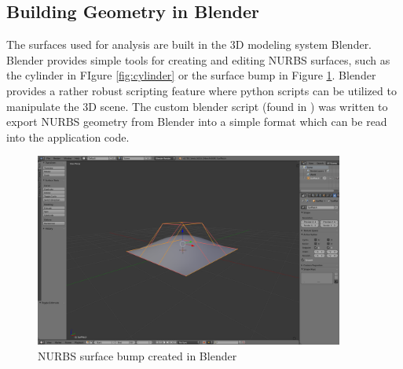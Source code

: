 \documentclass[./FinalReport.tex]{subfiles}
\begin{document}
\subsection{Building Geometry in Blender}
The surfaces used for analysis are built in the 3D modeling system Blender. Blender provides simple tools for creating and editing NURBS surfaces, such as the cylinder in FIgure \ref{fig:cylinder} or the surface bump in Figure \ref{fig:bump}. Blender provides  a rather robust scripting feature where python scripts can be utilized to manipulate the 3D scene. The custom blender script  (found in ) was written to export NURBS geometry from Blender into a simple format which can be read into the application code. 
\begin{figure}[!htbp]
  \centerline{\includegraphics[width=4in]{./figures/SrfBumpBlender}}
  \caption{NURBS surface bump created in Blender}
  \label{fig:bump}
\end{figure}
\end{document}
